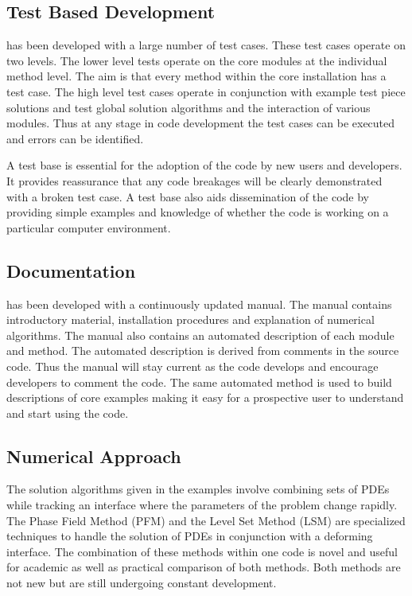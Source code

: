 \subsection{Test Based Development}

\FiPy{} has been developed with a large number of test cases.  These
test cases operate on two levels.  The lower level tests operate on
the core modules at the individual method level.  The aim is that
every method within the core installation has a test case.  The high
level test cases operate in conjunction with example test piece
solutions and test global solution algorithms and the interaction of
various modules.  Thus at any stage in code development the test cases
can be executed and errors can be identified.

A test base is essential for the adoption of the code by new users and
developers. It provides reassurance that any code breakages will be
clearly demonstrated with a broken test case. A test base also aids
dissemination of the code by providing simple examples and knowledge
of whether the code is working on a particular computer environment.

\subsection{Documentation}

\FiPy{} has been developed with a continuously updated manual. The
manual contains introductory material, installation procedures and
explanation of numerical algorithms. The manual also contains an
automated description of each module and method. The automated
description is derived from comments in the source code. Thus the
manual will stay current as the code develops and encourage developers
to comment the code. The same automated method is used to build
descriptions of core examples making it easy for a prospective user to
understand and start using the code.

\subsection{Numerical Approach}

The solution algorithms given in the \FiPy{} examples involve combining
sets of PDEs while tracking an interface where the parameters of the
problem change rapidly. The Phase Field Method (PFM) and the Level Set
Method (LSM) are specialized techniques to handle the solution of
PDEs in conjunction with a deforming interface. The combination of
these methods within one code is novel and useful for academic as well
as practical comparison of both methods. Both methods are not new but
are still undergoing constant development.


